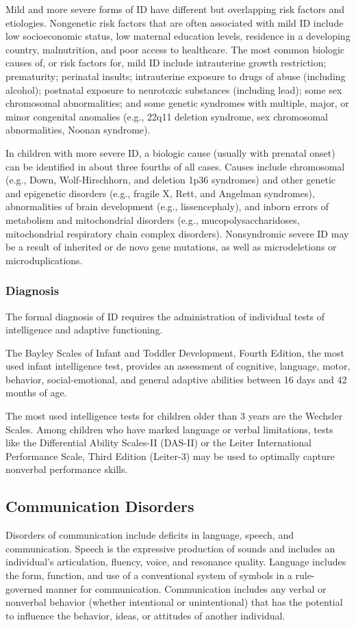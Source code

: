 Mild and more severe forms of ID have different but overlapping risk
factors and etiologies. Nongenetic risk factors that are often associated
with mild ID include low socioeconomic status, low maternal education levels,
residence in a developing country, malnutrition, and poor
access to healthcare. The most common biologic causes of, or risk factors for,
mild ID include intrauterine growth restriction; prematurity;
perinatal insults; intrauterine exposure to drugs of abuse (including
alcohol); postnatal exposure to neurotoxic substances (including lead);
some sex chromosomal abnormalities; and some genetic syndromes
with multiple, major, or minor congenital anomalies (e.g., 22q11 deletion
syndrome, sex chromosomal abnormalities, Noonan syndrome). \cite{Nelson56}

In children with more severe ID, a biologic cause (usually with prenatal onset)
can be identified in about three fourths of all cases. Causes
include chromosomal (e.g., Down, Wolf-­Hirschhorn, and deletion 1p36
syndromes) and other genetic and epigenetic disorders (e.g., fragile X,
Rett, and Angelman syndromes), abnormalities of brain development
(e.g., lissencephaly), and inborn errors of metabolism and mitochondrial
disorders (e.g., mucopolysaccharidoses, mitochondrial respiratory
chain complex disorders). Nonsyndromic severe ID may be
a result of inherited or de novo gene mutations, as well as microdeletions or
microduplications. \cite{Nelson56}

\subsubsection{Diagnosis}
The formal diagnosis of ID requires the administration of individual
tests of intelligence and adaptive functioning.

The Bayley Scales of Infant and Toddler Development, Fourth Edition, the most
used infant intelligence test, provides an assessment
of cognitive, language, motor, behavior, social-­emotional, and general
adaptive abilities between 16 days and 42 months of age. \cite{Nelson56}

The most used intelligence tests for children older than 3 years
are the Wechsler Scales. Among children who have marked language or verbal
limitations, tests like the Differential Ability Scales-II (DAS-­II) or the
Leiter International Performance Scale, Third Edition (Leiter-3) may be used
to optimally capture nonverbal performance skills. \cite{Nelson56}

\subsection{Communication Disorders}
Disorders of communication include deficits in language, speech, and communication. Speech is the expressive production of sounds and includes an individual’s articulation, fluency, voice, and resonance quality. Language includes the form, function, and use of a conventional system of symbols in a rule-governed manner for communication. Communication includes any verbal or nonverbal behavior (whether intentional or unintentional) that has the potential to influence the behavior, ideas, or attitudes of another individual. \cite{DSM5TR}

